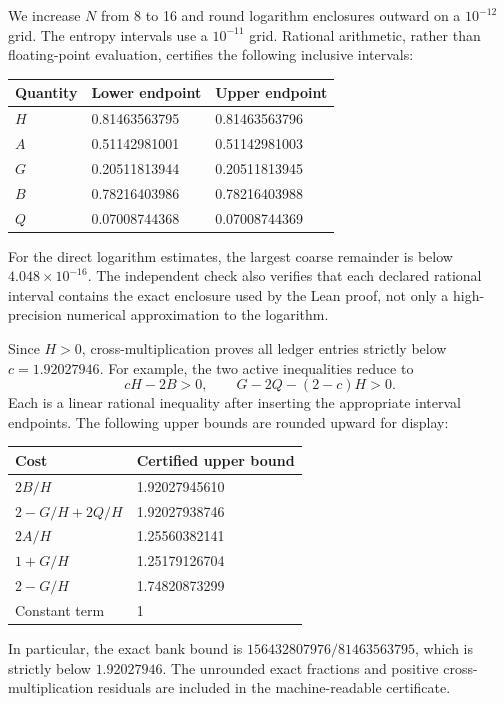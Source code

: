 \documentclass[11pt,a4paper]{article}
\begin{document}
We increase $N$ from 8 to 16 and round logarithm enclosures outward on a
$10^{-12}$ grid. The entropy intervals use a $10^{-11}$ grid. Rational
arithmetic, rather than floating-point evaluation, certifies the following
inclusive intervals:
\begin{center}
\begin{tabular}{@{}lll@{}}
\toprule Quantity & Lower endpoint & Upper endpoint\\\midrule
$H$ & 0.81463563795 & 0.81463563796\\
$A$ & 0.51142981001 & 0.51142981003\\
$G$ & 0.20511813944 & 0.20511813945\\
$B$ & 0.78216403986 & 0.78216403988\\
$Q$ & 0.07008744368 & 0.07008744369\\\bottomrule
\end{tabular}
\end{center}
For the direct logarithm estimates, the largest coarse remainder is below
$4.048\times10^{-16}$. The independent check also verifies that each
declared rational interval contains the exact enclosure used by the Lean
proof, not only a high-precision numerical approximation to the logarithm.

Since $H>0$, cross-multiplication proves all ledger entries strictly below
$c=1.92027946$. For example, the two active inequalities reduce to
\[
 cH-2B>0,\qquad G-2Q-(2-c)H>0.
\]
Each is a linear rational inequality after inserting the appropriate interval
endpoints. The following upper bounds are rounded upward for display:
\begin{center}
\begin{tabular}{@{}ll@{}}
\toprule Cost & Certified upper bound\\\midrule
$2B/H$ & 1.92027945610\\
$2-G/H+2Q/H$ & 1.92027938746\\
$2A/H$ & 1.25560382141\\
$1+G/H$ & 1.25179126704\\
$2-G/H$ & 1.74820873299\\
Constant term & 1\\\bottomrule
\end{tabular}
\end{center}
In particular, the exact bank bound is
$156432807976/81463563795$, which is strictly below $1.92027946$.
The unrounded exact fractions and positive cross-multiplication residuals
are included in the machine-readable certificate.
\end{document}
